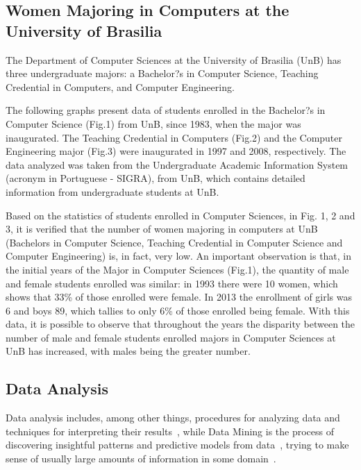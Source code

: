 \subsection{Women Majoring in Computers at the University of Brasilia}

The Department of Computer Sciences at the University of Brasilia (UnB) has three undergraduate majors: a Bachelor?s in Computer Science, Teaching Credential in Computers, and Computer Engineering.

The following graphs present data of students enrolled in the Bachelor?s in Computer Science (Fig.1) from UnB, since 1983, when the major was inaugurated. The Teaching Credential in Computers (Fig.2) and the Computer Engineering major (Fig.3) were inaugurated in 1997 and 2008, respectively. The data analyzed was taken from the Undergraduate Academic Information System (acronym in Portuguese - SIGRA), from UnB, which contains detailed information from undergraduate students at UnB.

Based on the statistics of students enrolled in Computer Sciences, in Fig. 1, 2 and 3, it is verified that the number of women majoring in computers at UnB (Bachelors in Computer Science, Teaching Credential in Computer Science and Computer Engineering) is, in fact, very low. An important observation  is that, in the initial years of the Major in Computer Sciences (Fig.1), the quantity of male and female students enrolled was similar: in 1993 there were 10 women, which shows that 33\% of those enrolled were female. In 2013 the enrollment of girls was 6 and boys 89, which tallies to only 6\% of those enrolled being female. With this data, it is possible to observe that throughout the years the disparity between the number of male and female students enrolled majors in Computer Sciences at UnB has increased, with males being the greater number.



\subsection{Data Analysis}\label{subsec:background:data}%

Data analysis includes, among other things, procedures for analyzing data and techniques for interpreting their results~\cite{Tukey1962}, while Data Mining is the process of discovering insightful patterns and predictive models from data~\cite{Zaki2014}, trying to make sense of usually large amounts of information in some domain~\cite{Cios2007}. 

